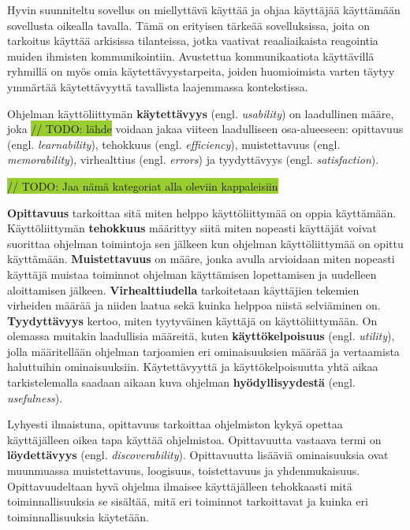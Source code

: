 \documentclass[utf8]{gradu3}
\begin{document}
Hyvin suunniteltu sovellus on miellyttävä käyttää ja ohjaa käyttäjää käyttämään sovellusta oikealla tavalla. Tämä on erityisen tärkeää sovelluksissa, joita on tarkoitus käyttää arkisissa tilanteissa, jotka vaativat reaaliaikaista reagointia muiden ihmisten kommunikointiin. Avustettua kommunikaatiota käyttävillä ryhmillä on myös omia käytettävyystarpeita, joiden huomioimista varten täytyy ymmärtää käytettävyyttä tavallista laajemmassa kontekstissa.

\label{general-usability-requirements}
Ohjelman käyttöliittymän \textbf{käytettävyys} (engl. \textit{usability}) on laadullinen määre, joka \colorbox{YellowGreen}{// TODO: lähde} voidaan jakaa viiteen laadulliseen osa-alueeseen: opittavuus (engl. \textit{learnability}), tehokkuus (engl. \textit{efficiency}), muistettavuus (engl. \textit{memorability}), virhealttius (engl. \textit{errors}) ja tyydyttävyys (engl. \textit{satisfaction}).

\colorbox{YellowGreen}{// TODO: Jaa nämä kategoriat alla oleviin kappaleisiin}

\textbf{Opittavuus} tarkoittaa sitä miten helppo käyttöliittymää on oppia käyttämään. Käyttöliittymän \textbf{tehokkuus} määrittyy siitä miten nopeasti käyttäjät voivat suorittaa ohjelman toimintoja sen jälkeen kun ohjelman käyttöliittymää on opittu käyttämään. \textbf{Muistettavuus} on määre, jonka avulla arvioidaan miten nopeasti käyttäjä muistaa toiminnot ohjelman käyttämisen lopettamisen ja uudelleen aloittamisen jälkeen. \textbf{Virhealttiudella} tarkoitetaan käyttäjien tekemien virheiden määrää ja niiden laatua sekä kuinka helppoa niistä selviäminen on. \textbf{Tyydyttävyys} kertoo, miten tyytyväinen käyttäjä on käyttöliittymään. On olemassa muitakin laadullisia määreitä, kuten \textbf{käyttökelpoisuus} (engl. \textit{utility}), jolla määritellään ohjelman tarjoamien eri ominaisuuksien määrää ja vertaamista haluttuihin ominaisuuksiin. Käytettävyyttä ja käyttökelpoisuutta yhtä aikaa tarkistelemalla saadaan aikaan kuva ohjelman \textbf{hyödyllisyydestä} (engl. \textit{usefulness}). \parencite[]{usability-101}

Lyhyesti ilmaistuna, opittavuus tarkoittaa ohjelmiston kykyä opettaa käyttäjälleen oikea tapa käyttää ohjelmistoa. Opittavuutta vastaava termi on \textbf{löydettävyys} (engl. \textit{discoverability}). Opittavuutta lisääviä ominaisuuksia ovat muunmuassa muistettavuus, loogisuus, toistettavuus ja yhdenmukaisuus. Opittavuudeltaan hyvä ohjelma ilmaisee käyttäjälleen tehokkaasti mitä toiminnallisuuksia se sisältää, mitä eri toiminnot tarkoittavat ja kuinka eri toiminnallisuuksia käytetään. \parencite[]{improving-learnability}
\end{document}
